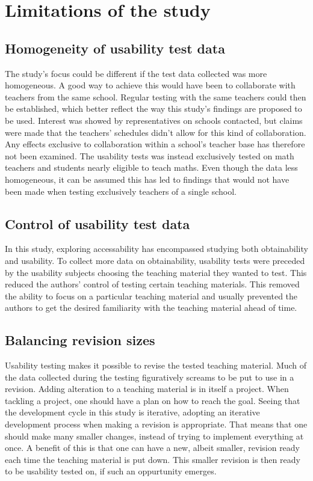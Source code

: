 \section{Limitations of the study}
\subsection{Homogeneity of usability test data}
The study's focus could be different if the test data collected was more homogeneous. A good way to achieve this would have been to collaborate with teachers from the same school. Regular testing with the same teachers could then be established, which better reflect the way this study's findings are proposed to be used. Interest was showed by representatives on schools contacted, but claims were made that the teachers' schedules didn't allow for this kind of collaboration. 
Any effects exclusive to collaboration within a school's teacher base has therefore not been examined. The usability tests was instead exclusively tested on math teachers and students nearly eligible to teach maths. Even though the data less homogeneous, it can be assumed this has led to findings that would not have been made when testing exclusively teachers of a single school.

\subsection{Control of usability test data}
In this study, exploring accessability has encompassed studying both obtainability and usability. To collect more data on obtainability, usability tests were preceded by the usability subjects choosing the teaching material they wanted to test. This reduced the authors' control of testing certain teaching materials. 
This removed the ability to focus on a particular teaching material and usually prevented the authors to get the desired familiarity with the teaching material ahead of time.

\subsection{Balancing revision sizes}
Usability testing makes it possible to revise the tested teaching material. Much of the data collected during the testing figuratively screams to be put to use in a revision. Adding alteration to a teaching material is in itself a project. When tackling a project, one should have a plan on how to reach the goal. Seeing that the development cycle in this study is iterative, adopting an iterative development process when making a revision is appropriate. 
That means that one should make many smaller changes, instead of trying to implement everything at once. A benefit of this is that one can have a new, albeit smaller, revision ready each time the teaching material is put down. This smaller revision is then ready to be usability tested on, if such an oppurtunity emerges. 

